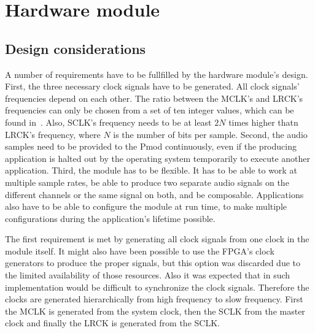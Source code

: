 \section{Hardware module}\label{sec:hardware}
\subsection{Design considerations}
A number of requirements have to be fullfilled by the hardware module's design. First, the three necessary clock signals have to be generated. All clock signals' frequencies depend on each other. The ratio between the MCLK's and LRCK's frequencies can only be chosen from a set of ten integer values, which can be found in~\cite{cirruslogic}. Also, SCLK's frequency needs to be at least $2N$ times higher thatn LRCK's frequency, where $N$ is the number of bits per sample. Second, the audio samples need to be provided to the Pmod continuously, even if the producing application is halted out by the operating system temporarily to execute another application. Third, the module has to be flexible. It has to be able to work at multiple sample rates, be able to produce two separate audio signals on the different channels or the same signal on both, and be composable. Applications also have to be able to configure the module at run time, to make multiple configurations during the application's lifetime possible. 

The first requirement is met by generating all clock signals from one clock in the module itself. It might also have been possible to use the FPGA's clock generators to produce the proper signals, but this option was discarded due to the limited availability of those resources. Also it was expected that in such implementation would be difficult to synchronize the clock signals. Therefore the clocks are generated hierarchically from high frequency to slow frequency. First the MCLK is generated from the system clock, then the SCLK from the master clock and finally the LRCK is generated from the SCLK. 


